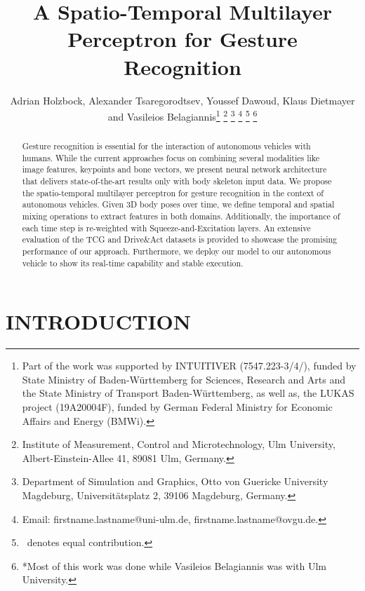 \documentclass[letterpaper, 10 pt, conference]{ieeeconf}
\title{\LARGE \bf
A Spatio-Temporal Multilayer Perceptron for Gesture Recognition
}
\author{Adrian Holzbock, Alexander Tsaregorodtsev, Youssef Dawoud, Klaus Dietmayer \\ and Vasileios Belagiannis\thanks{Part of the work was supported by INTUITIVER (7547.223-3/4/), funded by State Ministry of Baden-Württemberg for Sciences, Research and Arts and the State Ministry of Transport Baden-Württemberg, as well as, the LUKAS project (19A20004F), funded by German Federal Ministry for Economic Affairs and Energy (BMWi).}
\thanks{Institute of Measurement, Control and Microtechnology,
        Ulm University, Albert-Einstein-Allee 41, 89081 Ulm, Germany.}
\thanks{Department of Simulation and Graphics,
        Otto von Guericke University Magdeburg, Universitätsplatz 2, 39106 Magdeburg, Germany.}
\thanks{Email: firstname.lastname@uni-ulm.de, firstname.lastname@ovgu.de.}
\thanks{\dag\ denotes equal contribution.}
\thanks{*Most of this work was done while Vasileios Belagiannis was with Ulm University.}
}
\begin{document}
\newcommand\copyrighttextinitial{
    \scriptsize This work has been submitted to the IEEE for possible publication. Copyright may be transferred without notice, after which this version may no longer be accessible.}
    
\newcommand\copyrighttextfinal{
    \scriptsize\copyright\ 2022 IEEE. Personal use of this material is permitted. Permission from IEEE must be obtained for all other uses, in any current or future media, including reprinting/republishing this material for advertising or promotional purposes, creating new collective works, for resale or redistribution to servers or lists, or reuse of any copyrighted component of this work in other works. DOI: 10.1109/IV51971.2022.9827054.}
    
\newcommand\copyrightnotice{
}

\maketitle
\copyrightnotice
\thispagestyle{empty}
\pagestyle{empty}


\begin{abstract}

Gesture recognition is essential for the interaction of autonomous vehicles with humans. While the current approaches focus on combining several modalities like image features, keypoints and bone vectors, we present neural network architecture that delivers state-of-the-art results only with body skeleton input data. We propose the spatio-temporal multilayer perceptron for gesture recognition in the context of autonomous vehicles. Given 3D body poses over time, we define temporal and spatial mixing operations to extract features in both domains. Additionally, the importance of each time step is re-weighted with Squeeze-and-Excitation layers. An extensive evaluation of the TCG and Drive\&Act datasets is provided to showcase the promising performance of our approach. Furthermore, we deploy our model to our autonomous vehicle to show its real-time capability and stable execution.

\end{abstract}




\section{INTRODUCTION}
\end{document}
